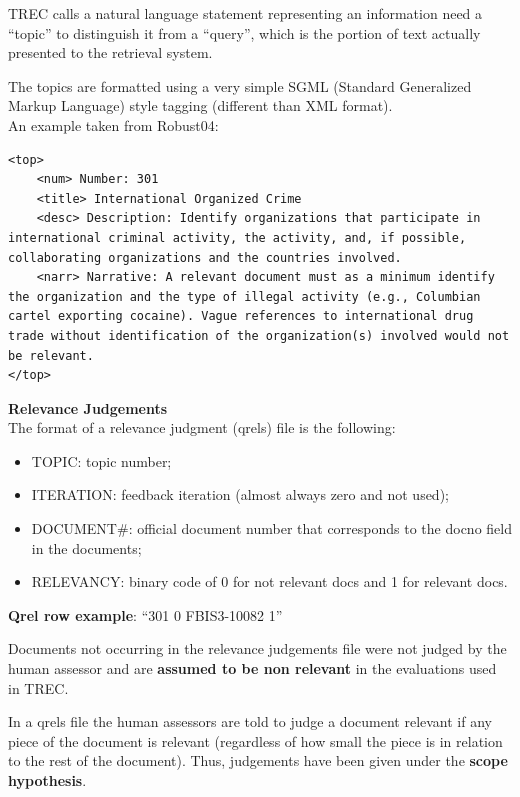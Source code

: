 TREC calls a natural language statement representing an information need a ``topic'' to distinguish it from a ``query'', which is the portion of text actually presented to the retrieval system.

The topics are formatted using a very simple SGML (Standard Generalized Markup Language) style tagging (different than XML format).\\

An example taken from Robust04:\\

\lstset{language=XML,basicstyle=\ttfamily,breaklines=true}

\begin{lstlisting}
<top>
	<num> Number: 301
	<title> International Organized Crime
	<desc> Description: Identify organizations that participate in international criminal activity, the activity, and, if possible, collaborating organizations and the countries involved.
	<narr> Narrative: A relevant document must as a minimum identify the organization and the type of illegal activity (e.g., Columbian cartel exporting cocaine). Vague references to international drug trade without identification of the organization(s) involved would not be relevant.
</top>
\end{lstlisting}

\textbf{Relevance Judgements}\\

The format of a relevance judgment (qrels) file is the following:

\begin{itemize}
\item TOPIC: topic number;
\item ITERATION: feedback iteration (almost always zero and not used);
\item DOCUMENT\#: official document number that corresponds to the docno field in the documents;
\item RELEVANCY: binary code of 0 for not relevant docs and 1 for relevant docs.
\end{itemize}

\textbf{Qrel row example}: ``301 0 FBIS3-10082 1''

Documents not occurring in the relevance judgements file were not judged by the human assessor and are \textbf{assumed to be non relevant} in the evaluations used in TREC.

In a qrels file the human assessors are told to judge a document relevant if any
piece of the document is relevant (regardless of how small the piece is in
relation to the rest of the document). Thus, judgements have been given under the \textbf{scope hypothesis}.


